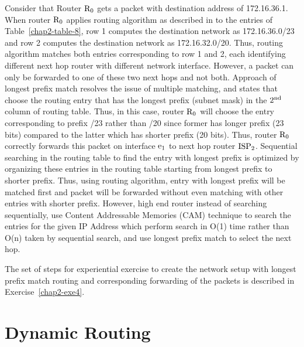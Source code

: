 \begin{multicols}{2}
Consider that Router ${\rm R}_{0}$ gets a packet with destination address of 172.16.36.1. When router ${\rm R}_{0}$ applies routing algorithm as described in to the entries of Table~\ref{chap2-table-8}, row 1 computes the destination network as 172.16.36.0/23 and row 2 computes the destination network as 172.16.32.0/20. Thus, routing algorithm matches both entries corresponding to row 1 and 2, each identifying different next hop router with different network interface. However, a packet can only be forwarded to one of these two next hops and not both. Approach of longest prefix match resolves the issue of multiple matching, and states that choose the routing entry that has the longest prefix (subnet mask) in the $2^{\rm nd}$ column of routing table. Thus, in this case, router ${\rm R}_{0}$ will choose the entry corresponding to prefix /23 rather than /20 since former has longer prefix (23 bits) compared to the latter which has shorter prefix (20 bits). Thus, router ${\rm R}_{0}$ correctly forwards this packet on interface ${\rm e}_{1}$ to next hop router ${\rm ISP}_{2}$. Sequential searching in the routing table to find the entry with longest prefix is optimized by organizing these entries in the routing table starting from longest prefix to shorter prefix. Thus, using routing algorithm, entry with longest prefix will be matched first and packet will be forwarded without even matching with other entries with shorter prefix. However, high end router instead of searching sequentially, use Content Addressable Memories (CAM) technique to search the entries for the given IP Address which perform search in O(1) time rather than O(n) taken by sequential search, and use longest prefix match to select the next hop.

\vspace{-.3cm}

The set of steps for experiential exercise to create the network setup with longest prefix match routing and corresponding forwarding of the packets is described in Exercise~\ref{chap2-exe4}.

\vspace{-.3cm}

\section{Dynamic Routing}\label{chap2-sec7}

\vspace{-.3cm}


\end{multicols}
